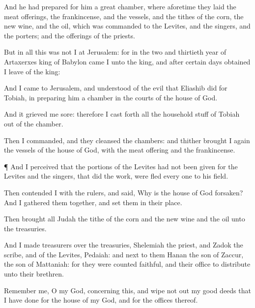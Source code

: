 {And he had
prepared for him a
great
chamber, where
aforetime they
laid the meat
offerings, the
frankincense, and the
vessels, and the
tithes of the
corn, the new
wine, and the
oil, which was
commanded
{} to the
Levites, and the
singers, and the
porters; and the
offerings of the
priests.

But in all this
{} was not I at
Jerusalem: for in the
two and
thirtieth
year of
Artaxerxes
king of
Babylon
came I unto the
king, and
after certain
days obtained I
leave of the
king:

And I
came to
Jerusalem, and
understood of the
evil that
Eliashib
did for
Tobiah, in
preparing him a
chamber in the
courts of the
house of
God.

And it
grieved me
sore: therefore I cast
forth all the
household
stuff of
Tobiah out
of the
chamber.

Then I
commanded, and they
cleansed the
chambers: and thither brought I
again the
vessels of the
house of
God, with the meat
offering and the
frankincense.


\par }{\PP {}¶ And I
perceived that the
portions of the
Levites had not been
given
{} for the
Levites and the
singers, that
did the
work, were
fled every
one to his
field.

Then
contended I with the
rulers, and
said, Why is the
house of
God
forsaken? And I gathered them
together, and
set them in their
place.

Then
brought all
Judah the
tithe of the
corn and the new
wine and the
oil unto the
treasuries.

And I made
treasurers over the
treasuries,
Shelemiah the
priest, and
Zadok the
scribe, and of the
Levites,
Pedaiah: and next to
them
{}
Hanan the
son of
Zaccur, the
son of
Mattaniah: for they were
counted
faithful, and their office
{} to
distribute unto their
brethren.

Remember me, O my
God, concerning this, and wipe not
out my
good deeds that I have
done for the
house of my
God, and for the
offices thereof.


}
